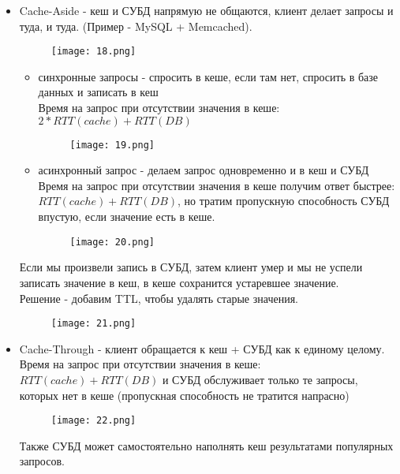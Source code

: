     \begin{itemize}
        \item Cache-Aside - кеш и СУБД напрямую не общаются, клиент делает запросы и туда, и туда. (Пример - MySQL + Memcached).\\
        \begin{figure}[h]
            \centering
            \texttt{[image: 18.png]}
            \caption{}
        \end{figure}
        \begin{itemize}
            \item синхронные запросы - спросить в кеше, если там нет, спросить в базе данных и записать в кеш \\
            Время на запрос при отсутствии значения в кеше: $2 * RTT(cache) + RTT(DB)$\\
            \begin{figure}[h]
                \centering
                \texttt{[image: 19.png]}
                \caption{}
            \end{figure}
            \item асинхронный запрос - делаем запрос одновременно и в кеш и СУБД \\
            Время на запрос при отсутствии значения в кеше получим ответ быстрее: $RTT(cache) + RTT(DB)$, но тратим пропускную способность СУБД впустую, если значение есть в кеше.\\
            \begin{figure}[h]
                \centering
                \texttt{[image: 20.png]}
                \caption{}
            \end{figure}
        \end{itemize}
        Если мы произвели запись в СУБД, затем клиент умер и мы не успели записать значение в кеш, в кеше сохранится устаревшее значение. \\
        Решение - добавим TTL, чтобы удалять старые значения.\\
        \begin{figure}[h]
            \centering
            \texttt{[image: 21.png]}
            \caption{}
        \end{figure}
        \item Cache-Through - клиент обращается к кеш + СУБД как к единому целому. \\
        Время на запрос при отсутствии значения в кеше: $RTT(cache) + RTT(DB)$ и СУБД обслуживает только те запросы, которых нет в кеше (пропускная способность не тратится напрасно) \\
        \begin{figure}[h]
            \centering
            \texttt{[image: 22.png]}
            \caption{}
        \end{figure}
        Также СУБД может самостоятельно наполнять кеш результатами популярных запросов.
    \end{itemize}

